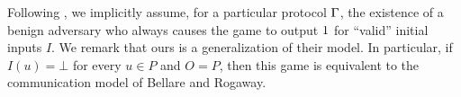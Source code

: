 Following \cite{protos}, we implicitly assume, for a particular protocol
$\mathrm{\Gamma}$,  the existence of a benign adversary who always causes the game to
output $1$ for ``valid'' initial inputs $I$.  We remark that ours is a
generalization of their model.  In particular, if $I(u) = \bot$ for every $u \in
P$ and $O = P$, then this game is equivalent to the communication model of
Bellare and Rogaway.
